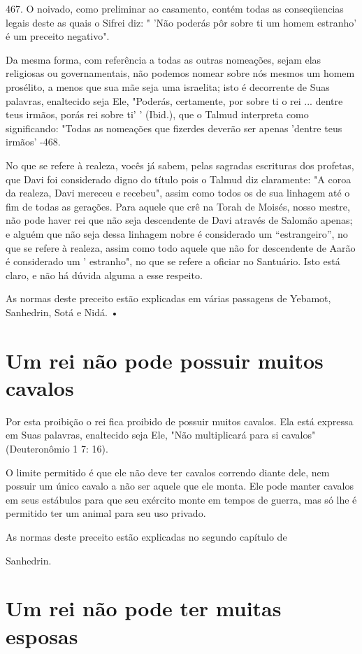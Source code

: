 467. O noivado, como preliminar ao casamento, contém todas as
conseqüencias legais deste
as quais o Sifrei diz: " 'Não poderás pôr sobre ti um homem estranho' é
um preceito negativo".

Da mesma forma, com referência a todas as outras nomeações, se­jam elas
religiosas ou governamentais, não podemos nomear sobre nós mes­mos um
homem prosélito, a menos que sua mãe seja uma israelita; isto é
decor­rente de Suas palavras, enaltecido seja Ele, "Poderás, certamente,
por sobre ti o rei ... dentre teus irmãos, porás rei sobre ti' '
(Ibid.), que o Talmud interpreta como significando: "Todas as nomeações
que fizerdes deverão ser apenas 'dentre teus irmãos' -468.

No que se refere à realeza, vocês já sabem, pelas sagradas escrituras
dos profetas, que Davi foi considerado digno do título pois o Talmud diz
clara­mente: "A coroa da realeza, Davi mereceu e recebeu", assim como
todos os de sua linhagem até o fim de todas as gerações. Para aquele que
crê na Torah de Moisés, nosso mestre, não pode haver rei que não seja
descendente de Davi atra­vés de Salomão apenas; e alguém que não seja
dessa linhagem nobre é conside­rado um ``estrangeiro'', no que se refere à
realeza, assim como todo aquele que não for descendente de Aarão é
considerado um ' estranho", no que se refere a oficiar no Santuário.
Isto está claro, e não há dúvida alguma a esse respeito.

As normas deste preceito estão explicadas em várias passagens de
Yebamot, Sanhedrin, Sotá e Nidá. •

\section{Um rei não pode possuir muitos cavalos}

Por esta proibição o rei fica proibido de possuir muitos cavalos. Ela
está expressa em Suas palavras, enaltecido seja Ele, "Não multiplicará
para si cavalos" (Deuteronômio 1 7: 16).

O limite permitido é que ele não deve ter cavalos correndo diante dele,
nem possuir um único cavalo a não ser aquele que ele monta. Ele pode
manter cavalos em seus estábulos para que seu exército monte em tempos
de guerra, mas só lhe é permitido ter um animal para seu uso privado.


As normas deste preceito estão explicadas no segundo capítulo de


Sanhedrin.

\section{Um rei não pode ter muitas esposas}

